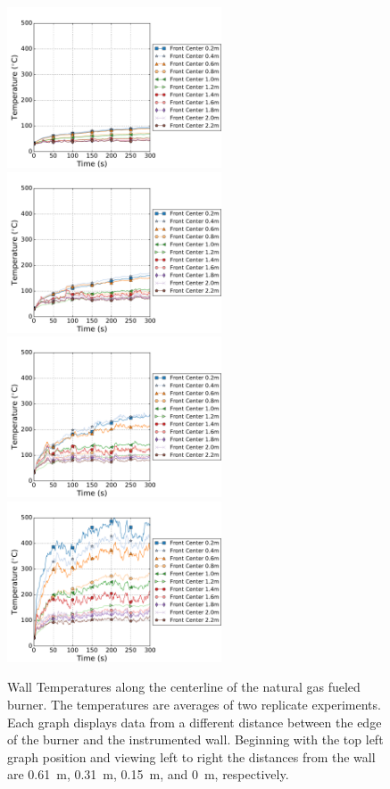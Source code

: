 \documentclass[twoside]{uocthesis}
\begin{document}
{\begin{figure}[ht!]
	\centering
		\includegraphics[width=2.5in]{../Figures/TWNG01_TC_Surface_Center_Avg}
		\includegraphics[width=2.5in]{../Figures/TWNG03_TC_Surface_Center_Avg}\\
		\includegraphics[width=2.5in]{../Figures/TWNG05_TC_Surface_Center_Avg}
		\includegraphics[width=2.5in]{../Figures/TWNG07_TC_Surface_Center_Avg}\\
	\caption[Wall Temperatures along the centerline of the natural gas fueled burner]{Wall Temperatures along the centerline of the natural gas fueled burner. The temperatures are averages of two replicate experiments. Each graph displays data from a different distance between the edge of the burner and the instrumented wall.  Beginning with the top left graph position and viewing left to right the distances from the wall are 0.61~m, 0.31~m, 0.15~m, and 0~m, respectively.}
	\label{TC_Surf_Cent_TWNG_comp}
\end{figure}

}
\end{document}
